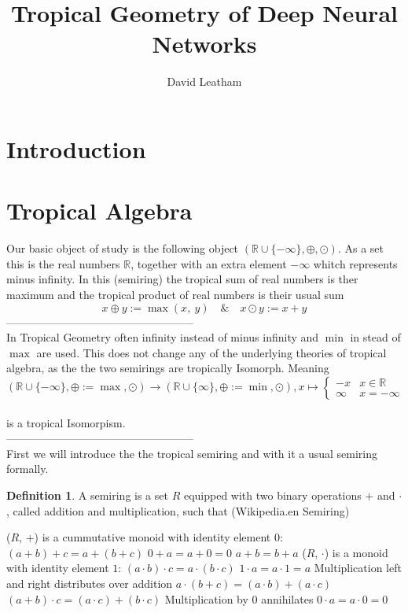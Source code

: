 \documentclass{article}
\title{Tropical Geometry of Deep Neural Networks}
\author{David Leatham}
\theoremstyle{definition}
\newtheorem{definition}[theorem]{Definition}
\begin{document}
\maketitle

\newpage
  
\tableofcontents

\newpage


\section{Introduction}

\newpage

\section{Tropical Algebra}

Our basic object of study is the following object $( \mathbb{R} \cup \{- \infty \} , \oplus , \odot )$. As a set this is the real numbers $ \mathbb{R} $, together with an extra element $- \infty $ whitch represents minus infinity. In this (semiring) the tropical sum of real numbers is ther maximum and the tropical product of real numbers is their usual sum 
$$ x \oplus y := \max(x,\ y) \quad \& \quad x \odot y := x+y$$
--------------------------------------------------- \\
In Tropical Geometry often infinity instead of minus infinity and $\min$ in stead of $\max$ are used. This does not change any of the underlying theories of tropical algebra, as the the two semirings are tropically Isomorph. Meaning 
$$( \mathbb{R} \cup \{- \infty \} , \oplus := \max, \odot ) \to ( \mathbb{R} \cup \{ \infty \} , \oplus := \min , \odot ), x \mapsto \begin{cases} 
-x & x \in \mathbb{R}\\
\infty & x = - \infty
\end{cases}$$\\
is a tropical Isomorpism. \\
--------------------------------------------------- \\
First we will introduce the the tropical semiring and with it a usual semiring formally.
\begin{definition}
A semiring is a set $R$ equipped with two binary operations $+$ and $\cdot$, called addition and multiplication, such that (Wikipedia.en Semiring)
\begin{outline}
  \1 ($R$, $+$) is a cummutative monoid with identity element 0:
    \2 $(a + b) + c = a + (b + c)$
    \2 $0 + a = a + 0 = 0$
    \2 $a + b = b + a$
  \1 ($R$, $\cdot$) is a monoid with identity element $1$:
    \2 $(a \cdot b) \cdot c = a \cdot (b \cdot c)$
    \2 $ 1 \cdot a = a \cdot 1 = a $
  \1 Multiplication left and right distributes over addition
    \2 $ a \cdot (b + c) = (a \cdot b) + (a \cdot c)$
    \2 $ (a + b) \cdot c = (a \cdot c) + (b \cdot c)$
  \1 Multiplication by 0 annihilates
    \2 $ 0 \cdot a = a \cdot 0 = 0$
\end{outline}
\end{definition}
\end{document}
